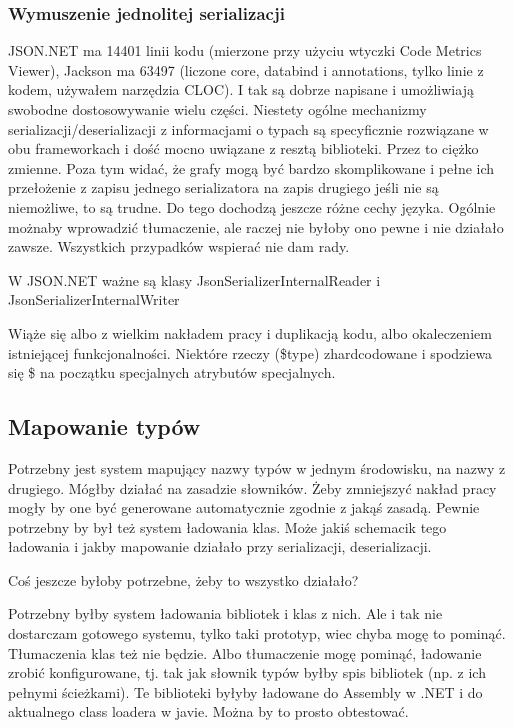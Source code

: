 \subsubsection{Wymuszenie jednolitej serializacji}
JSON.NET ma 14401 linii kodu (mierzone przy użyciu wtyczki Code Metrics Viewer), Jackson ma 63497 (liczone core, databind i annotations, tylko linie z kodem, używałem narzędzia CLOC). I tak są dobrze napisane i umożliwiają swobodne dostosowywanie wielu części. Niestety ogólne mechanizmy serializacji/deserializacji z informacjami o typach są specyficznie rozwiązane w obu frameworkach i dość mocno uwiązane z resztą biblioteki. Przez to ciężko zmienne.
Poza tym widać, że grafy mogą być bardzo skomplikowane i pełne ich przełożenie z zapisu jednego serializatora na zapis drugiego jeśli nie są niemożliwe, to są trudne. Do tego dochodzą jeszcze różne cechy języka.
Ogólnie możnaby wprowadzić tłumaczenie, ale raczej nie byłoby ono pewne i nie działało zawsze.
Wszystkich przypadków wspierać nie dam rady.

W JSON.NET ważne są klasy JsonSerializerInternalReader i JsonSerializerInternalWriter

Wiąże się albo z wielkim nakładem pracy i duplikacją kodu, albo okaleczeniem istniejącej funkcjonalności. Niektóre rzeczy (\$type) zhardcodowane i spodziewa się \$ na początku specjalnych atrybutów specjalnych.


\subsection{Mapowanie typów}
Potrzebny jest system mapujący nazwy typów w jednym środowisku, na nazwy z drugiego. Mógłby działać na zasadzie słowników. Żeby zmniejszyć nakład pracy mogły by one być generowane automatycznie zgodnie z jakąś zasadą.
Pewnie potrzebny by był też system ładowania klas.
Może jakiś schemacik tego ładowania i jakby mapowanie działało przy serializacji, deserializacji.

Coś jeszcze byłoby potrzebne, żeby to wszystko działało?

Potrzebny byłby system ładowania bibliotek i klas z nich. Ale i tak nie dostarczam gotowego systemu, tylko taki prototyp, wiec chyba mogę to pominąć. Tłumaczenia klas też nie będzie. Albo tłumaczenie mogę pominąć, ładowanie zrobić konfigurowane, tj. tak jak słownik typów byłby spis bibliotek (np. z ich pełnymi ścieżkami). Te biblioteki byłyby ładowane do Assembly w .NET i do aktualnego class loadera w javie. Można by to prosto obtestować.



